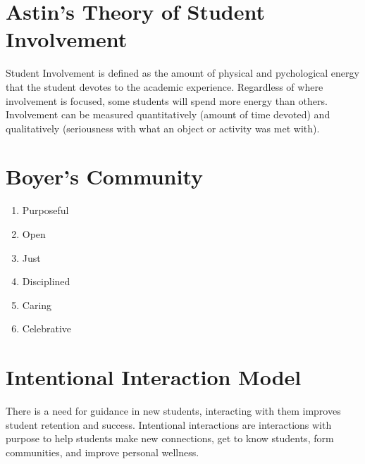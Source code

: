 \documentclass{article}
\begin{document}
\section{Astin's Theory of Student Involvement}
Student Involvement is defined as the amount of physical and pychological energy that the student devotes to the academic experience. Regardless of where involvement is focused, some students will spend more energy than others. Involvement can be measured quantitatively (amount of time devoted) and qualitatively (seriousness with what an object or activity was met with).

\section{Boyer's Community}
\begin{enumerate}
  \item Purposeful
  \item Open
  \item Just
  \item Disciplined
  \item Caring
  \item Celebrative
\end{enumerate}

\section{Intentional Interaction Model}
There is a need for guidance in new students, interacting with them improves student retention and success. Intentional interactions are interactions with purpose to help students make new connections, get to know students, form communities, and improve personal wellness.
\end{document}
